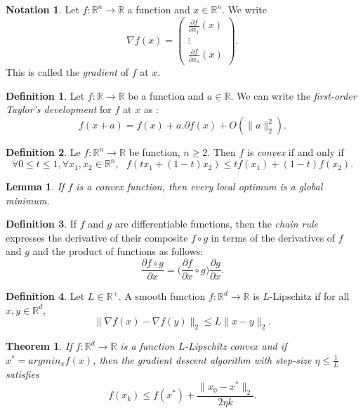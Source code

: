 \documentclass[10pt,a4paper]{article}
\theoremstyle{definition}
\newtheorem{definition}{Definition}
\newtheorem{notation}{Notation}
\theoremstyle{plain}
\newtheorem{theorem}{Theorem}
\newtheorem{prop}{Lemma}
\begin{document}
\begin{notation}
Let $f: \mathbb{R}^n \to \mathbb{R}$ a function and $x\in \mathbb{R}^n$. We write
$$
\nabla f(x) = \begin{pmatrix}
\frac{\partial f}{\partial x_1}(x) \\
\vdots \\
\frac{\partial f}{\partial x_n}(x)
\end{pmatrix}.
$$
This is called the \textit{gradient} of $f$ at $x$.
\end{notation}

\begin{definition}
Let $f: \mathbb{R} \rightarrow \mathbb{R}$ be a function and $a\in \mathbb{R}$.
We can write the \textit{first-order Taylor's development} for $f$ at $x$ as :
$$
f(x + a) = f(x) + a . \partial f(x) + O(\| a\|_2^2).
$$
\end{definition}

\begin{definition}
Le $f: \mathbb{R}^n \rightarrow \mathbb{R}$ be function, $n\geq 2$. Then $f$ is \textit{convex} if and only if
$$
\forall 0\leq t \leq 1, \forall x_1,x_2\in \mathbb{R}^n, \ \ \ f(tx_1 + (1-t)x_2) \leq tf(x_1) + (1-t)f(x_2).
$$
\end{definition}

\begin{prop}\label{gb}
If $f$ is a convex function, then every local optimum is a global minimum.
\end{prop}

\begin{definition}
If $f$ and $g$ are differentiable functions, then the \textit{chain rule} expresses the derivative of their composite $f \circ g$ in terms of the derivatives of $f$ and $g$ and the product of functions as follows:
$$
\frac{\partial f \circ g}{\partial x} = \Big(\frac{\partial f}{\partial x} \circ g\Big)\frac{\partial g}{\partial x}.
$$
\end{definition}

\begin{definition}
Let $L\in \mathbb{R}^+$. A smooth function $f:\mathbb{R}^d \to \mathbb{R}$ is $L$-Lipschitz if for all $x,y \in \mathbb{R}^d$,
$$
\| \nabla f(x) - \nabla f(y) \|_2 \leqslant L \|x-y\|_2.
$$
\end{definition}

\begin{theorem} \label{thmconvgd}
If $f : \mathbb{R}^d \to \mathbb{R}$ is a function $L$-Lipschitz convex and if $x^* = argmin_x f(x)$, then the gradient descent algorithm with step-size $\eta \leqslant \frac{1}{L}$ satisfies
$$
f(x_{k}) \leqslant f(x^*) + \frac{\|x_0 - x^* \|_2}{2\eta k} .
$$
\end{theorem}

\newpage

\nocite{*}


\end{document}

